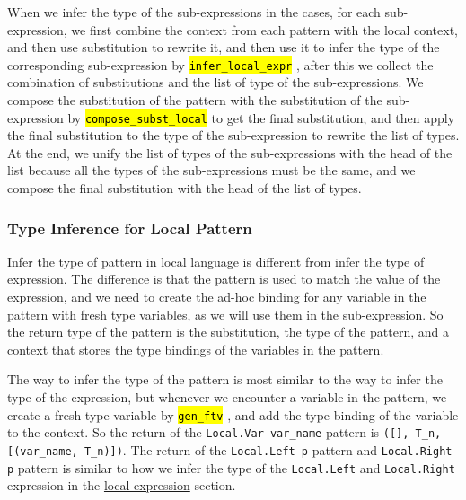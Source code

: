 \documentclass{article}
\newcommand{\highlighttexttt}[2][black]{ %
  \sethlcolor{cyan!10} %
  \texttt{\textcolor{#1}{\hl{#2}}}
}
\begin{document}
\begin{itemize}
                  When we infer the type of the sub-expressions in the cases,
                  for each sub-expression, we first combine the context from each pattern with the local context, and then use substitution to rewrite it,
                  and then use it to infer the type of the corresponding sub-expression by \highlighttexttt{infer\_local\_expr},
                  after this we collect the combination of substitutions and the list of type of the sub-expressions. We compose the substitution of the pattern
                  with the substitution of the sub-expression by \highlighttexttt{compose\_subst\_local} to get the final substitution, and then apply the final substitution
                  to the type of the sub-expression to rewrite the list of types. At the end, we unify the list of types of the sub-expressions with the
                  head of the list because all the types of the sub-expressions must be the same, and we compose the final substitution with the head of the list of types.
        \end{itemize}

    \subsubsection{Type Inference for Local Pattern}\label{local_pattern}
        Infer the type of pattern in local language is different from infer the type of expression.
        The difference is that the pattern is used to match the value of the expression, and we need to
        create the ad-hoc binding for any variable in the pattern with fresh type variables, as we will use them in the sub-expression.
        So the return type of the pattern is the substitution, the type of the pattern, and a context that stores the type bindings of the variables in the pattern.

        The way to infer the type of the pattern is most similar to the way to infer the type of the expression,
        but whenever we encounter a variable in the pattern, we create a fresh type variable by \highlighttexttt{gen\_ftv},
        and add the type binding of the variable to the context. So the return of the \texttt{Local.Var var\_name} pattern is
        \texttt{([], T\_n, [(var\_name, T\_n)])}. The return of the \texttt{Local.Left p} pattern and \texttt{Local.Right p} pattern is similar to
        how we infer the type of the \texttt{Local.Left} and \texttt{Local.Right} expression in the \hyperref[local_expr]{local expression} section.
\end{document}
